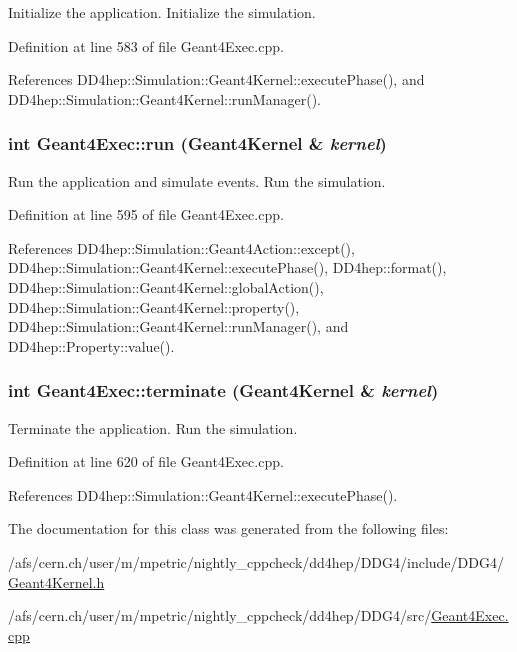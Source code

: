 Initialize the application. Initialize the simulation. 

Definition at line 583 of file Geant4Exec.cpp.

References DD4hep::Simulation::Geant4Kernel::executePhase(), and DD4hep::Simulation::Geant4Kernel::runManager().\hypertarget{class_d_d4hep_1_1_simulation_1_1_geant4_exec_a006a064ae70aa7839d656ae7cdd8fc59}{
\subsubsection[{run}]{\setlength{\rightskip}{0pt plus 5cm}int Geant4Exec::run ({\bf Geant4Kernel} \& {\em kernel})}}
\label{class_d_d4hep_1_1_simulation_1_1_geant4_exec_a006a064ae70aa7839d656ae7cdd8fc59}


Run the application and simulate events. Run the simulation. 

Definition at line 595 of file Geant4Exec.cpp.

References DD4hep::Simulation::Geant4Action::except(), DD4hep::Simulation::Geant4Kernel::executePhase(), DD4hep::format(), DD4hep::Simulation::Geant4Kernel::globalAction(), DD4hep::Simulation::Geant4Kernel::property(), DD4hep::Simulation::Geant4Kernel::runManager(), and DD4hep::Property::value().\hypertarget{class_d_d4hep_1_1_simulation_1_1_geant4_exec_a592e79f8ae539bd7491cd3af0572555c}{
\subsubsection[{terminate}]{\setlength{\rightskip}{0pt plus 5cm}int Geant4Exec::terminate ({\bf Geant4Kernel} \& {\em kernel})}}
\label{class_d_d4hep_1_1_simulation_1_1_geant4_exec_a592e79f8ae539bd7491cd3af0572555c}


Terminate the application. Run the simulation. 

Definition at line 620 of file Geant4Exec.cpp.

References DD4hep::Simulation::Geant4Kernel::executePhase().

The documentation for this class was generated from the following files:\begin{DoxyCompactItemize}
\item 
/afs/cern.ch/user/m/mpetric/nightly\_\-cppcheck/dd4hep/DDG4/include/DDG4/\hyperlink{_geant4_kernel_8h}{Geant4Kernel.h}\item 
/afs/cern.ch/user/m/mpetric/nightly\_\-cppcheck/dd4hep/DDG4/src/\hyperlink{_geant4_exec_8cpp}{Geant4Exec.cpp}\end{DoxyCompactItemize}
